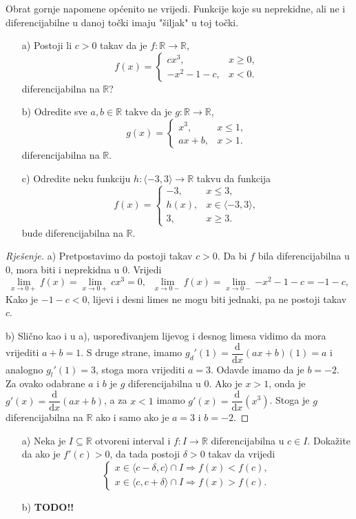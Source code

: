 Obrat gornje napomene općenito ne vrijedi. Funkcije koje su neprekidne, ali ne i diferencijabilne u danoj točki imaju "šiljak" u toj točki.
\begin{exercise} \textbf{}
\begin{itemize}
\item[a)] Postoji li $c>0$ takav da je $f : \mathbb{R}\to \mathbb{R}$,
$$f(x)=\begin{cases}
cx^3,& x\geq 0,\\
-x^2-1-c,& x<0.
\end{cases}$$
diferencijabilna na $\mathbb{R}$?
\item[b)] Odredite sve $a, b\in \mathbb{R}$ takve da je $g : \mathbb{R}\to \mathbb{R}$,
$$g(x)=\begin{cases}
x^3,& x\leq 1,\\
ax+b,& x>1.
\end{cases}$$
diferencijabilna na $\mathbb{R}$.
\item[c)] Odredite neku funkciju $h : \langle -3, 3\rangle\to \mathbb{R}$ takvu da funkcija
$$f(x)=\begin{cases}
-3,& x\leq 3,\\
h(x),& x\in \langle -3, 3\rangle,\\
3,& x\geq 3.
\end{cases}$$
bude diferencijabilna na $\mathbb{R}$.
\end{itemize}
\end{exercise}
\begin{proof}[Rješenje]
a) Pretpostavimo da postoji takav $c>0$. Da bi $f$ bila diferencijabilna u $0$, mora biti i neprekidna u $0$. Vrijedi
$$\lim\limits_{x\to 0+}{f(x)}=\lim\limits_{x\to 0+}{cx^3}=0,\;\; \lim\limits_{x\to 0-}{f(x)}=\lim\limits_{x\to 0-}{-x^2-1-c}=-1-c,$$
Kako je $-1-c<0$, lijevi i desni limes ne mogu biti jednaki, pa ne postoji takav $c$.

b) Slično kao i u a), uspoređivanjem lijevog i desnog limesa vidimo da mora vrijediti $a+b=1$. S druge strane, imamo $g_d'(1)=\dfrac{\mathrm{d}}{\mathrm{d}x}(ax+b)(1)=a$ i analogno $g_l'(1)=3$, stoga mora vrijediti $a=3$. Odavde imamo da je $b=-2$. Za ovako odabrane $a$ i $b$ je $g$ diferencijabilna u $0$. Ako je $x>1$, onda je $g'(x)=\dfrac{\mathrm{d}}{\mathrm{d}x}(ax+b)$, a za $x<1$ imamo $g'(x)=\dfrac{\mathrm{d}}{\mathrm{d}x}(x^3)$. Stoga je $g$ diferencijabilna na $\mathbb{R}$ ako i samo ako je $a=3$ i $b=-2$.
\end{proof}
\begin{exercise} \textbf{}
\begin{itemize}
\item[a)] Neka je $I\subseteq \mathbb{R}$ otvoreni interval i $f : I \to \mathbb{R}$ diferencijabilna u $c\in I$. Dokažite da ako je $f'(c)>0$, da tada postoji $\delta>0$ takav da vrijedi
$$
\begin{cases}
x\in \langle c-\delta, c\rangle\cap I\Rightarrow f(x)<f(c),\\
x\in \langle c, c+\delta\rangle\cap I\Rightarrow f(x)>f(c).
\end{cases}
$$
\item[b)] \textbf{TODO!!}
\end{itemize}
\end{exercise}
